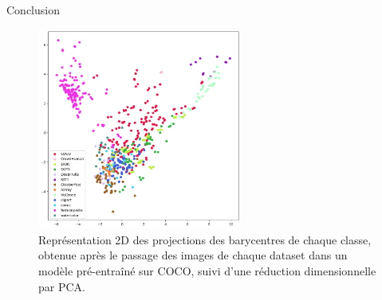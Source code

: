 \begin{subsectionframemod}{Conclusion}
    \begin{figure}[!t]
        \centering
        \includegraphics[width=0.6\textwidth]{Figures/2d_class_plot.png}
        \caption{Représentation 2D des projections des barycentres de chaque classe, obtenue après le passage des images de chaque dataset dans un modèle pré-entraîné sur COCO, suivi d'une réduction dimensionnelle par PCA.}
        \label{fig:2dclass}
    \end{figure}
\end{subsectionframemod}


